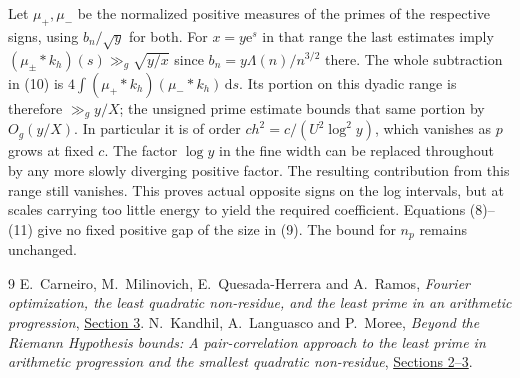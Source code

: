 \documentclass[11pt]{article}
\newcommand{\e}{\mathrm e}
\newcommand{\dd}{\,\mathrm d}
\begin{document}
Let $\mu_+,\mu_-$ be the normalized positive measures of the primes
of the respective signs, using $b_n/\sqrt y$ for both. For $x=y\e^s$
in that range the last estimates imply
$(\mu_\pm*k_h)(s)\gg_g\sqrt{y/x}$ since $b_n=y\Lambda(n)/n^{3/2}$
there. The whole subtraction in (10) is
$4\int(\mu_+*k_h)(\mu_-*k_h)\dd s$. Its portion on this dyadic
range is therefore $\gg_g y/X$; the unsigned prime estimate bounds
that same portion by $O_g(y/X)$. In particular it is of order
$c h^2=c/(U^2\log^2 y)$, which vanishes as $p$ grows at fixed $c$.
The factor $\log y$ in the fine width can be replaced throughout by
any more slowly diverging positive factor. The resulting contribution
from this range still vanishes.
This proves actual opposite signs on the log intervals, but at
scales carrying too little energy to yield the required coefficient.
Equations (8)--(11) give no fixed positive gap of the size in (9).
The bound for $n_p$ remains unchanged.

\begin{thebibliography}{9}
 E.~Carneiro, M.~Milinovich, E.~Quesada-Herrera and
A.~Ramos, \emph{Fourier optimization, the least quadratic non-residue,
and the least prime in an arithmetic progression},
\href{https://arxiv.org/html/2404.08380v2#S3}{Section 3}.
 N.~Kandhil, A.~Languasco and P.~Moree,
\emph{Beyond the Riemann Hypothesis bounds: A pair-correlation approach
to the least prime in arithmetic progression and the smallest quadratic
non-residue}, \href{https://arxiv.org/html/2607.14515v1#S3}{Sections 2--3}.
\end{thebibliography}
\end{document}
